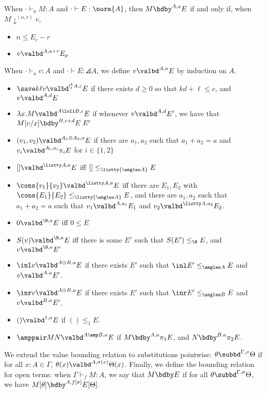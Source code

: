 \begin{definition} \label{def:bounding}
When $\cdot \vdash_a M : A$ and $\cdot \vdash E : \norm{A}$, then $M \bdby^{A,a} E$ if and only if, when $M \downarrow^{(n,r)} v$,
\begin{itemize}
  \item $n \leq E_c - r$
  \item $v \valbd^{A,a+r} E_p$
\end{itemize}
When $\cdot \vdash_a v : A$ and $\cdot \vdash E : \angles A$, we define $v
\valbd^{A,a} E$ by induction on $A$.
\begin{itemize}
    \item $\save k \ell v \valbd^{!^k_\ell A,c} E$ if there exists $d \geq 0$ so that $kd + \ell \leq c$, and $v \valbd^{A,d} E$
    \item $\lambda x.M \valbd^{A \loli B, c} E$ if whenever $v \valbd^{A,d} E'$, we have that $M[v/x] \bdby^{B,c+d} E \; E'$
    \item $(v_1,v_2) \valbd^{A_1 \otimes A_2,a} E$ if there are $a_1,a_2$ such that $a_1+a_2 = a$ and $v_i \valbd^{A_i,a_i} \pi_i E$ for $i \in \{1,2\}$
    \item $[] \valbd^{\listty A,a} E$ iff $[] \leq_{\listty {\angles A}} E$
    \item $\cons {v_1} {v_2} \valbd^{\listty A,a} E$ iff there are $E_1,E_2$ with $\cons {E_1} {E_2} \leq_{\listty {\angles A}} E$, and there are $a_1,a_2$ such that $a_1 + a_2 = a$ such that $v_1 \valbd^{A,a_1} E_1$ and $v_2 \valbd^{\listty A, a_2} E_2$.
    \item $0 \valbd^{\N,a} E$ iff $0 \leq E$
    \item $S(v) \valbd^{\N,a} E$ iff there is some $E'$ such that $S(E') \leq_\N E$, and $v \valbd^{\N,a} E'$
    \item $\inl v \valbd^{A \oplus B,a} E$ if there exists $E'$ such that $\inl E' \leq_{\angles A} E$ and $v \valbd^{A,a} E'$.
    \item $\inr v \valbd^{A \oplus B,a} E$ if there exists $E'$ such that $\inr E' \leq_{\angles B} E$ and $v \valbd^{B,a} E'$.
    \item $() \valbd^{1,a} E$ if $() \leq_1 E$.
    \item $\amppair M N \valbd^{A \amp B,a} E$ if $M \bdby^{A,a} \pi_1 E$, and $N \bdby^{B,a} \pi_2 E$.
\end{itemize}
We extend the value bounding relation to substitutions pointwise: $\theta \subbd^{\Gamma,\sigma} \Theta$ if for all $x : A \in \Gamma$, $\theta(x) \valbd^{A,\sigma(x)} \Theta(x)$. Finally, we define the bounding relation for open terms: when $\Gamma \vdash_f M : A$, we say that $M \bdby E$ if for all $\theta \subbd^{\Gamma,\sigma} \Theta$, we have $M[\theta] \bdby^{A,f[\sigma]} E[\Theta]$.
\end{definition}

